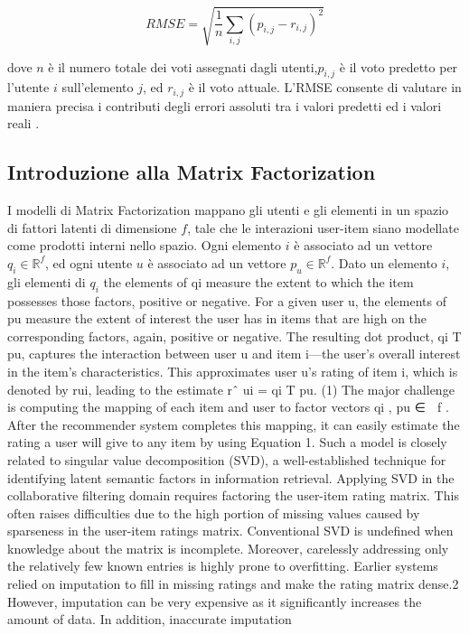 \documentclass[11pt]{article}
\begin{document}
\[ RMSE=\sqrt{\frac{1}{n}\sum_{{i,j}}(p_{i,j}-r_{i,j})^2} \]

dove $n$ è il numero totale dei voti assegnati dagli utenti,$p_{i,j}$ è il voto predetto per l'utente $i$ sull'elemento $j$, ed $r_{i,j}$ è il voto attuale. L'RMSE consente di valutare in maniera precisa i contributi degli errori assoluti tra i valori predetti ed i valori reali \cite{Su:2009:SCF:1592474.1722966}.
 
 \subsection{Introduzione alla Matrix Factorization}
I modelli di Matrix Factorization mappano gli utenti e gli elementi in un spazio di fattori latenti di dimensione $f$, tale che le interazioni user-item siano modellate come prodotti interni nello spazio. Ogni elemento $i$ è associato ad un vettore $q_i\in\mathbb{R}^f$, ed ogni utente $u$ è associato ad un vettore $p_u\in\mathbb{R}^f$. Dato un elemento $i$, gli elementi di $q_i$ the elements of qi measure the extent to
 which the item possesses those factors, positive or negative. For a given user u,
 the elements of pu measure the extent of interest the user has in items that are high
 on the corresponding factors, again, positive or negative. The resulting dot product,
 qi T
 pu, captures the interaction between user u and item i—the user’s overall interest in
 the item’s characteristics. This approximates user u’s rating of item i, which is denoted by rui, leading to the estimate
 rˆ
 ui = qi
 T
 pu. (1)
 The major challenge is computing the mapping
 of each item and user to factor vectors
 qi
 , pu ∈  f
 . After the recommender system
 completes this mapping, it can easily estimate
 the rating a user will give to any item
 by using Equation 1. Such a model is closely related to singular value decomposition
 (SVD), a well-established technique for identifying
 latent semantic factors in information retrieval. Applying
 SVD in the collaborative filtering domain requires factoring
 the user-item rating matrix. This often raises difficulties
 due to the high portion of missing values caused by sparseness
 in the user-item ratings matrix. Conventional SVD is
 undefined when knowledge about the matrix is incomplete.
 Moreover, carelessly addressing only the relatively
 few known entries is highly prone to overfitting.
 Earlier systems relied on imputation to fill in missing
 ratings and make the rating matrix dense.2
 However, imputation can be very expensive as it significantly increases
 the amount of data. In addition, inaccurate imputation
\end{document}
